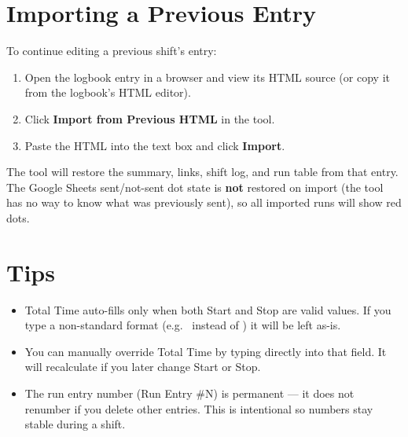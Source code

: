 \chapter{Importing a Previous Entry}
\label{ch:import}

To continue editing a previous shift's entry:

\begin{enumerate}
    \item Open the logbook entry in a browser and view its HTML source (or copy
          it from the logbook's HTML editor).
    \item Click \textbf{Import from Previous HTML} in the tool.
    \item Paste the HTML into the text box and click \textbf{Import}.
\end{enumerate}

The tool will restore the summary, links, shift log, and run table from that
entry. The Google Sheets sent/not-sent dot state is \textbf{not} restored on
import (the tool has no way to know what was previously sent), so all imported
runs will show red dots.

\chapter{Tips}

\begin{itemize}
    \item Total Time auto-fills only when both Start and Stop are valid
           values. If you type a non-standard format
          (e.g.\  instead of ) it will be left as-is.
    \item You can manually override Total Time by typing directly into that
          field. It will recalculate if you later change Start or Stop.
    \item The run entry number (Run Entry \#N) is permanent --- it does not
          renumber if you delete other entries. This is intentional so numbers
          stay stable during a shift.
\end{itemize}


